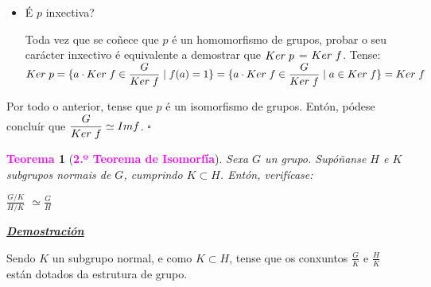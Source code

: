 \documentclass[twoside]{report}
\newcommand{\magbf}[1]{\textcolor{magenta}{\textbf{#1}}} %
\theoremstyle{mystyle}
\newtheorem{theo}{\magbf{Teorema}}[chapter]
\newenvironment{theorem}
{\begin{mdframed}[linecolor = magenta,backgroundcolor = classicrose, linewidth = 2mm]\begin{theo}}
{\end{theo}\end{mdframed}}
\begin{document}
\begin{itemize}
    \item É $p$ inxectiva?
    
    Toda vez que se coñece que $p$ é un homomorfismo de grupos, probar o seu carácter inxectivo é equivalente a demostrar que $Ker \hspace{1mm} p$ = $Ker \hspace{1mm} f$. Tense: \\
    
    $Ker \hspace{1mm} p = \{a \cdot Ker \hspace{1mm} f \in \displaystyle \frac{G}{Ker \hspace{1mm} f} \hspace{1mm} | \hspace{1mm} f(a) = 1 \} = \{a \cdot Ker \hspace{1mm} f \in \displaystyle \frac{G}{Ker \hspace{1mm} f} \hspace{1mm} | \hspace{1mm} a \in Ker \hspace{1mm} f \} = Ker \hspace{1mm} f$
    
\end{itemize}

\noindent Por todo o anterior, tense que $p$ é un isomorfismo de grupos. Entón, pódese concluír que $\displaystyle \frac{G}{Ker \hspace{1mm} f} \simeq Im f$. $\square$

\vspace{3mm}

\begin{theorem}[\magbf{2.º Teorema de Isomorfía}] \label{th1.6}
Sexa $G$ un grupo. Supóñanse $H$ e $K$ subgrupos normais de $G$, cumprindo $K \subset H$. Entón, verifícase:
\begin{center}
    $\displaystyle \frac{G/K}{H/K}$ $\simeq \displaystyle \frac{G}{H}$
\end{center}
\end{theorem}

\vspace{2mm}

\noindent \textbf{\textit{\underline{Demostración}}}

\noindent Sendo $K$ un subgrupo normal, e como $K \subset H$, tense que os conxuntos $\displaystyle \frac{G}{K}$ e $\displaystyle \frac{H}{K}$ están dotados da estrutura de grupo. \\
\end{document}

